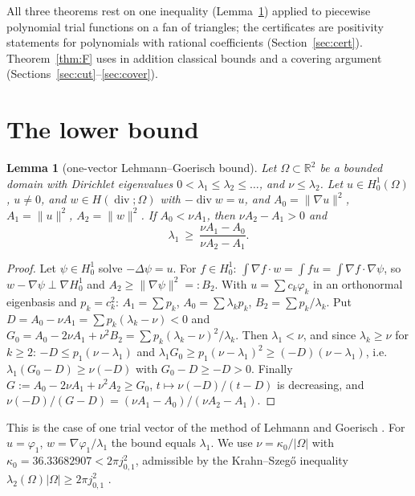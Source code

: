 \documentclass[11pt]{article}
\newtheorem{lemma}[theorem]{Lemma}
\theoremstyle{remark}
\newcommand{\R}{\mathbb{R}}
\DeclareMathOperator{\dv}{div}
\begin{document}
All three theorems rest on one inequality (Lemma~\ref{lem:LG}) applied to piecewise polynomial trial functions on a fan
of triangles; the certificates are positivity statements for polynomials with rational coefficients
(Section~\ref{sec:cert}). Theorem~\ref{thm:F} uses in addition classical bounds and a covering argument
(Sections~\ref{sec:cut}--\ref{sec:cover}).

\section{The lower bound}
\begin{lemma}[one-vector Lehmann--Goerisch bound]\label{lem:LG}
Let $\Omega\subset\R^2$ be a bounded domain with Dirichlet eigenvalues $0<\lambda_1\le\lambda_2\le\dots$, and
$\nu\le\lambda_2$. Let $u\in H^1_0(\Omega)$, $u\ne0$, and $w\in H(\dv;\Omega)$ with $-\dv w=u$, and
$A_0=\|\nabla u\|^2$, $A_1=\|u\|^2$, $A_2=\|w\|^2$. If $A_0<\nu A_1$, then $\nu A_2-A_1>0$ and
\[
\lambda_1\ \ge\ \frac{\nu A_1-A_0}{\nu A_2-A_1}.
\]
\end{lemma}
\begin{proof}
Let $\psi\in H^1_0$ solve $-\Delta\psi=u$. For $f\in H^1_0$: $\int\nabla f\cdot w=\int fu=\int\nabla f\cdot\nabla\psi$,
so $w-\nabla\psi\perp\nabla H^1_0$ and $A_2\ge\|\nabla\psi\|^2=:B_2$. With $u=\sum c_k\varphi_k$ in an orthonormal
eigenbasis and $p_k=c_k^2$: $A_1=\sum p_k$, $A_0=\sum\lambda_kp_k$, $B_2=\sum p_k/\lambda_k$. Put $D=A_0-\nu A_1=
\sum p_k(\lambda_k-\nu)<0$ and $G_0=A_0-2\nu A_1+\nu^2B_2=\sum p_k(\lambda_k-\nu)^2/\lambda_k$. Then $\lambda_1<\nu$, and
since $\lambda_k\ge\nu$ for $k\ge2$: $-D\le p_1(\nu-\lambda_1)$ and $\lambda_1G_0\ge p_1(\nu-\lambda_1)^2\ge
(-D)(\nu-\lambda_1)$, i.e.\ $\lambda_1(G_0-D)\ge\nu(-D)$ with $G_0-D\ge-D>0$. Finally $G:=A_0-2\nu A_1+\nu^2A_2\ge G_0$,
$t\mapsto\nu(-D)/(t-D)$ is decreasing, and $\nu(-D)/(G-D)=(\nu A_1-A_0)/(\nu A_2-A_1)$.
\end{proof}
This is the case of one trial vector of the method of Lehmann and Goerisch \cite{lehmann,gh,bg}. For $u=\varphi_1$,
$w=\nabla\varphi_1/\lambda_1$ the bound equals $\lambda_1$. We use $\nu=\kappa_0/|\Omega|$ with
$\kappa_0=36.33682907<2\pi j_{0,1}^2$, admissible by the Krahn--Szeg\H{o} inequality
$\lambda_2(\Omega)|\Omega|\ge2\pi j_{0,1}^2$ \cite{krahn,hong}.
\end{document}
